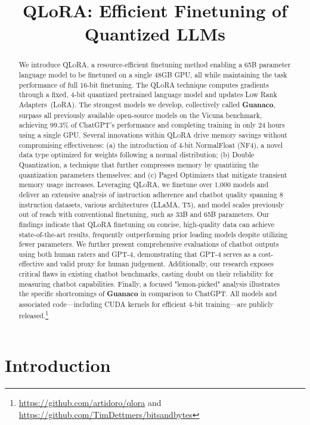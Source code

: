 \title{QLoRA: Efficient Finetuning of Quantized LLMs}

\begin{abstract}
We introduce \textsc{QLoRA}, a resource-efficient finetuning method enabling a 65B parameter language model to be finetuned on a single 48GB GPU, all while maintaining the task performance of full 16-bit finetuning. The \textsc{QLoRA} technique computes gradients through a fixed, 4-bit quantized pretrained language model and updates Low Rank Adapters~(LoRA). The strongest models we develop, collectively called \textbf{Guanaco}, surpass all previously available open-source models on the Vicuna benchmark, achieving 99.3\% of ChatGPT's performance and completing training in only 24 hours using a single GPU. Several innovations within \textsc{QLoRA} drive memory savings without compromising effectiveness: (a) the introduction of 4-bit NormalFloat (NF4), a novel data type optimized for weights following a normal distribution; (b) Double Quantization, a technique that further compresses memory by quantizing the quantization parameters themselves; and (c) Paged Optimizers that mitigate transient memory usage increases. Leveraging \textsc{QLoRA}, we finetune over 1,000 models and deliver an extensive analysis of instruction adherence and chatbot quality spanning 8 instruction datasets, various architectures (LLaMA, T5), and model scales previously out of reach with conventional finetuning, such as 33B and 65B parameters. Our findings indicate that QLoRA finetuning on concise, high-quality data can achieve state-of-the-art results, frequently outperforming prior leading models despite utilizing fewer parameters. We further present comprehensive evaluations of chatbot outputs using both human raters and GPT-4, demonstrating that GPT-4 serves as a cost-effective and valid proxy for human judgement. Additionally, our research exposes critical flaws in existing chatbot benchmarks, casting doubt on their reliability for measuring chatbot capabilities. Finally, a focused "lemon-picked" analysis illustrates the specific shortcomings of \textbf{Guanaco} in comparison to ChatGPT. All models and associated code—including CUDA kernels for efficient 4-bit training—are publicly released.\footnote{\url{https://github.com/artidoro/qlora} and \url{https://github.com/TimDettmers/bitsandbytes}}
\end{abstract}

\section{Introduction}

